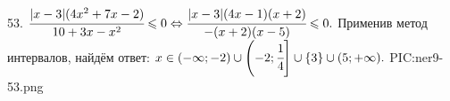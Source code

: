 53. $\cfrac{|x-3|(4x^2+7x-2)}{10+3x-x^2}\leqslant0\Leftrightarrow\cfrac{|x-3|(4x-1)(x+2)}{-(x+2)(x-5)}\leqslant0.$ Применив метод интервалов, найдём ответ: $x\in(-\infty;-2)\cup\left(-2;\cfrac{1}{4}\right]\cup\{3\}\cup(5;+\infty).$
{{PIC:ner9-53.png}}\\
